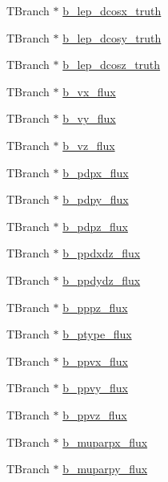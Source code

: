 \begin{DoxyCompactItemize}
\item 
T\-Branch $\ast$ \hyperlink{classanatree_aa8a950a15fa3163249d5632e9f7725e3}{b\-\_\-lep\-\_\-dcosx\-\_\-truth}
\item 
T\-Branch $\ast$ \hyperlink{classanatree_a567f358e0f5d8cca212cb0ddcf2734f8}{b\-\_\-lep\-\_\-dcosy\-\_\-truth}
\item 
T\-Branch $\ast$ \hyperlink{classanatree_af604029e402633b38d303c9d7dcad55a}{b\-\_\-lep\-\_\-dcosz\-\_\-truth}
\item 
T\-Branch $\ast$ \hyperlink{classanatree_a08d4c12d2e8cb9cdfcc427b5bedfd39e}{b\-\_\-vx\-\_\-flux}
\item 
T\-Branch $\ast$ \hyperlink{classanatree_a8cbcbb5828c9c6cc2123b740ae53f403}{b\-\_\-vy\-\_\-flux}
\item 
T\-Branch $\ast$ \hyperlink{classanatree_a56781e9f7ca91c1884358303ce0d07f2}{b\-\_\-vz\-\_\-flux}
\item 
T\-Branch $\ast$ \hyperlink{classanatree_a620f8a57b70fa1dc92cdebfbe6c4438d}{b\-\_\-pdpx\-\_\-flux}
\item 
T\-Branch $\ast$ \hyperlink{classanatree_a3983ebdfaf438e8d02cb380f23134e8d}{b\-\_\-pdpy\-\_\-flux}
\item 
T\-Branch $\ast$ \hyperlink{classanatree_a6a5cc8661dd7053144fbce7c494aa641}{b\-\_\-pdpz\-\_\-flux}
\item 
T\-Branch $\ast$ \hyperlink{classanatree_a115f3fa619deb7e0c7322c0fccc5ee05}{b\-\_\-ppdxdz\-\_\-flux}
\item 
T\-Branch $\ast$ \hyperlink{classanatree_a0b9060b468862d407a67123aaa6c069c}{b\-\_\-ppdydz\-\_\-flux}
\item 
T\-Branch $\ast$ \hyperlink{classanatree_a497c5c18f0ea0abb3017435c086d3902}{b\-\_\-pppz\-\_\-flux}
\item 
T\-Branch $\ast$ \hyperlink{classanatree_a06e55a0dc9b6e04d2d7f452b455996b8}{b\-\_\-ptype\-\_\-flux}
\item 
T\-Branch $\ast$ \hyperlink{classanatree_a719cff1cebb13d73c1fe8e90ca00e4fb}{b\-\_\-ppvx\-\_\-flux}
\item 
T\-Branch $\ast$ \hyperlink{classanatree_a5e4017ab48e75144d769258aad80398b}{b\-\_\-ppvy\-\_\-flux}
\item 
T\-Branch $\ast$ \hyperlink{classanatree_a19246cdffce6f1b74eb4a96abc854606}{b\-\_\-ppvz\-\_\-flux}
\item 
T\-Branch $\ast$ \hyperlink{classanatree_a9f57900436c5739afe8cfd1aada3251a}{b\-\_\-muparpx\-\_\-flux}
\item 
T\-Branch $\ast$ \hyperlink{classanatree_a5862c6680dbe6fcc0aa1643e38c1f01b}{b\-\_\-muparpy\-\_\-flux}

\end{DoxyCompactItemize}
